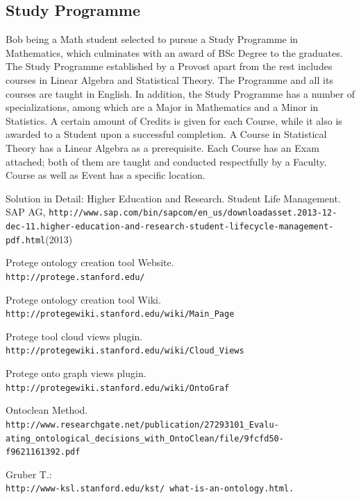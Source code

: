 \documentclass{article}    %
\begin{document}
\subsection{Study Programme}
%
Bob being a Math student selected to pursue a Study Programme in Mathematics, which culminates with an award of BSc Degree to the graduates. The Study Programme established by a Provost apart from the rest includes courses in Linear Algebra and Statistical Theory. The Programme and all its courses are taught in English. In addition, the Study Programme has a number of specializations, among which are a Major in Mathematics and a Minor in Statistics.
A certain amount of Credits is given for each Course, while it also is awarded to a Student upon a successful completion. A Course in Statistical Theory has a Linear Algebra as a prerequisite. Each Course has an Exam attached; both of them are taught and conducted respectfully by a Faculty. Course as well as Event has a specific location. 


%
%
\begin{thebibliography}{99}
%
Solution in Detail: Higher Education and Research. Student Life Management.
SAP AG, \texttt{http://www.sap.com/bin/sapcom/en\_us/downloadasset.2013-12-dec-11.higher-education-and-research-student-lifecycle-\newline management-pdf.html}(2013)

Protege ontology creation tool Website.\\
\texttt{http://protege.stanford.edu/}

Protege ontology creation tool Wiki.\\
\texttt{http://protegewiki.stanford.edu/wiki/Main\_Page}

Protege tool cloud views plugin.\\
\texttt{http://protegewiki.stanford.edu/wiki/Cloud\_Views}

Protege onto graph views plugin.\\
\texttt{http://protegewiki.stanford.edu/wiki/OntoGraf}

Ontoclean Method.\\
\texttt{http://www.researchgate.net/publication/27293101\_Evalu-\newline
ating\_ontological\_decisions\_with\_OntoClean/file/9fcfd50-\newline
f9621161392.pdf}

Gruber T.:
\\
\texttt{http://www-ksl.stanford.edu/kst/ what-is-an-ontology.html.} 



\end{thebibliography}
\end{document}
